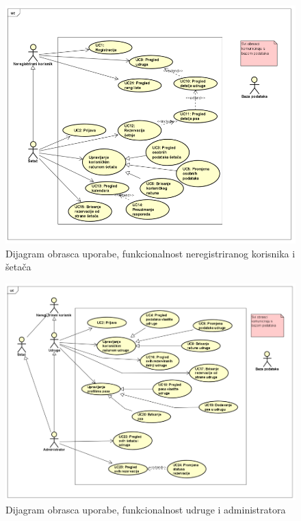 					\begin{figure}[H]
		                \includegraphics[scale=0.9]{dijagrami/uc-dijagram-1.PNG} 
	                	\centering
	                   	\caption{Dijagram obrasca uporabe, funkcionalnost neregistriranog korisnika i šetača}
	                	\label{fig:uc-1}
	                \end{figure}
	                
	                \begin{figure}[H]
		                \includegraphics[scale=0.9]{dijagrami/uc-dijagram-2.PNG} 
	                	\centering
	                   	\caption{Dijagram obrasca uporabe, funkcionalnost udruge i administratora}
	                	\label{fig:uc-1}
	                \end{figure}
	                
